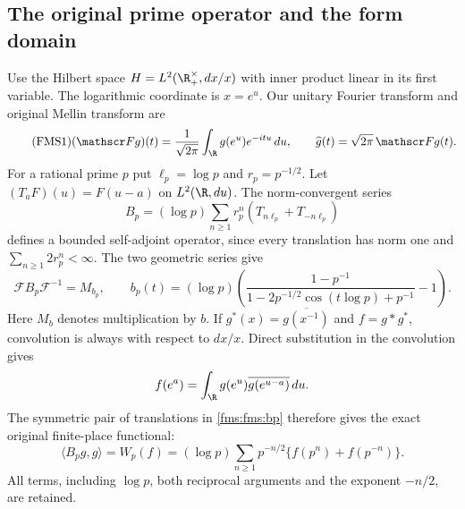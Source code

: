 \documentclass[11pt,a4paper]{article}
\theoremstyle{definition}\newtheorem{definition}[theorem]{Definition}
\begin{document}
\subsection{The original prime operator and the form domain}

Use the Hilbert space $H=L^2(\R_+^\times,dx/x)$ with inner product
linear in its first variable.  The logarithmic coordinate is $x=e^u$.
Our unitary Fourier transform and original Mellin transform are
\begin{equation}\tag{FMS1}\label{fms:fms:fourier}
 (\mathscr Fg)(t)=\frac1{\sqrt{2\pi}}\int_\R g(e^u)e^{-itu}\,du,
 \qquad \widehat g(t)=\sqrt{2\pi}\,\mathscr Fg(t).
\end{equation}
For a rational prime $p$ put $\ell_p=\log p$ and $r_p=p^{-1/2}$.
Let $(T_aF)(u)=F(u-a)$ on $L^2(\R,du)$.  The norm-convergent series
\begin{equation}\tag{FMS2}\label{fms:fms:bp}
 B_p=(\log p)\sum_{n\ge1}r_p^n(T_{n\ell_p}+T_{-n\ell_p})
\end{equation}
defines a bounded self-adjoint operator, since every translation has
norm one and $\sum_{n\ge1}2r_p^n<\infty$.  The two geometric series give
\begin{equation}\tag{FMS3}\label{fms:fms:multiplier}
 \mathscr FB_p\mathscr F^{-1}=M_{b_p},\qquad
 b_p(t)=(\log p)
 \left(\frac{1-p^{-1}}{1-2p^{-1/2}\cos(t\log p)+p^{-1}}-1\right).
\end{equation}
Here $M_b$ denotes multiplication by $b$.  If
$g^*(x)=\overline{g(x^{-1})}$ and $f=g*g^*$, convolution is always
with respect to $dx/x$.  Direct substitution in the convolution gives
\[
 f(e^a)=\int_\R g(e^u)\overline{g(e^{u-a})}\,du.
\]
The symmetric pair of translations in \eqref{fms:fms:bp} therefore gives
the exact original finite-place functional:
\begin{equation}\tag{FMS4}\label{fms:fms:local}
 \langle B_pg,g\rangle
 =W_p(f)
 =(\log p)\sum_{n\ge1}p^{-n/2}\{f(p^n)+f(p^{-n})\}.
\end{equation}
All terms, including $\log p$, both reciprocal arguments and the
exponent $-n/2$, are retained.
\end{document}

